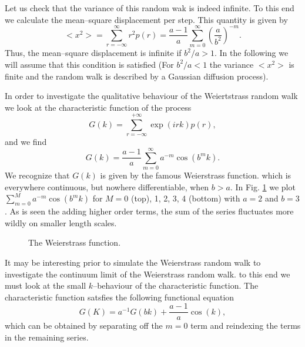 Let us check that the variance of this random wak is indeed infinite. To this
end we calculate the mean--square displacement per step. This quantity is
given by
\begin{displaymath}
  <x^2> = \sum_{r=-\infty}^{\infty} r^2 p(r) =
        \frac{a-1}{a} \sum_{m=0}^{\infty} \left( \frac{a}{b^2} \right)^{-m}.
\end{displaymath}
Thus, the mean--square displacement is infinite if $b^2/a >1$. In the
following we will assume that this condition is satisfied (For $b^2/a <1$
the variance $<x^2>$ is finite and the random walk is described by a Gaussian
diffusion process).

In order to investigate the qualitative behaviour of the Weiertstrass random
walk  we look at the characteristic function of the process
\begin{displaymath}
  G(k) = \sum_{r=-\infty}^{+\infty} \exp(irk) p(r),
\end{displaymath}
and we find
\begin{displaymath}
  G(k) = \frac{a-1}{a} \sum_{m=0}^{\infty} a^{-m} \cos(b^m k).
\end{displaymath}
We recognize that $G(k)$ is given by the famous Weierstrass function. which is
everywhere continuous, but nowhere differentiable, when $b>a$.  In Fig. 
\ref{Fig:Weierstrass}
we plot $\sum_{m=0}^{M} a^{-m} \cos(b^m k)$ for $M=0$ (top), 1, 2, 3, 4
(bottom) with $a=2$ and $b=3$. As is seen the  adding higher order terms, the
sum of the series fluctuates more wildly on smaller length scales.

\begin{figure}
\caption{The Weierstrass function.}
\label{Fig:Weierstrass}
\end{figure}

It may be interesting prior to simulate the Weierstrass random walk to
investigate the continuum limit of the Weierstrass random walk. to this end we
must look at  the small $k$--behaviour of the characteristic function. The
characteristic function satsfies the following functional equation
\begin{equation}
\label{eq:FunctionalWeierstrass}
  G(K) = a^{-1} G(bk) + \frac{a-1}{a} \cos(k),
\end{equation}
which can be obtained by separating off the $m=0$ term and reindexing the
terms in the remaining series. 

